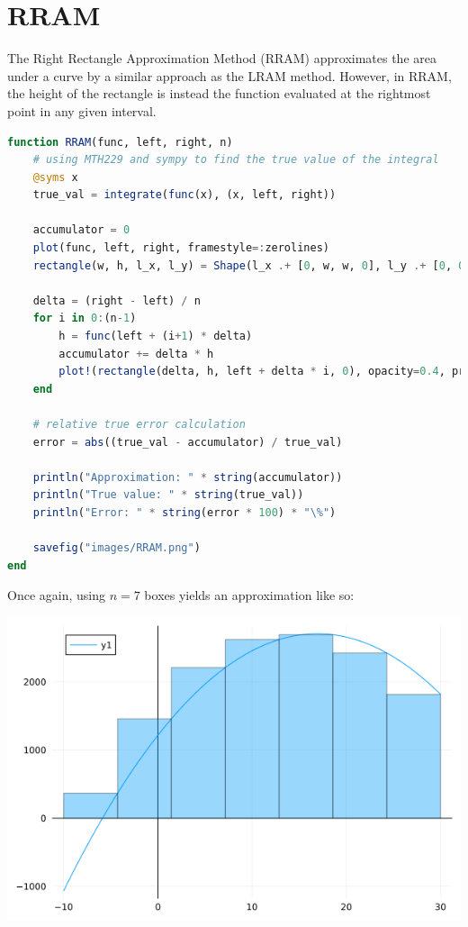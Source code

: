 \documentclass[12pt]{article}
\begin{document}
\section{RRAM}
    The Right Rectangle Approximation Method (RRAM) approximates the area under a curve by a 
    similar approach as the LRAM method. However, in RRAM, the height of the rectangle is instead the function evaluated at the 
    rightmost point in any given interval. 
    \begin{lstlisting}[language=julia]
function RRAM(func, left, right, n) 
    # using MTH229 and sympy to find the true value of the integral
    @syms x 
    true_val = integrate(func(x), (x, left, right))

    accumulator = 0
    plot(func, left, right, framestyle=:zerolines)
    rectangle(w, h, l_x, l_y) = Shape(l_x .+ [0, w, w, 0], l_y .+ [0, 0, h, h])

    delta = (right - left) / n
    for i in 0:(n-1)
        h = func(left + (i+1) * delta)
        accumulator += delta * h
        plot!(rectangle(delta, h, left + delta * i, 0), opacity=0.4, primary=false)
    end

    # relative true error calculation
    error = abs((true_val - accumulator) / true_val)

    println("Approximation: " * string(accumulator))
    println("True value: " * string(true_val))
    println("Error: " * string(error * 100) * "\%")
    
    savefig("images/RRAM.png")
end
    \end{lstlisting}
    Once again, using $n=7$ boxes yields an approximation like so:
    \begin{center}
        \includegraphics*[scale=0.45]{images/RRAM_1.png}
    \end{center}
\end{document}
